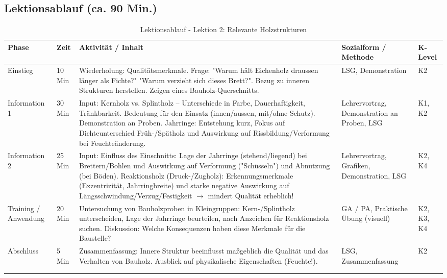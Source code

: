 \documentclass[12pt, a4paper]{article}
\begin{document}
\subsection{Lektionsablauf (ca. 90 Min.)}
\begin{longtable}{|p{}|p{}|>{\raggedright\arraybackslash}p{}|p{}|p{}|}
    \hline
    \textbf{Phase} & \textbf{Zeit} & \textbf{Aktivität / Inhalt} & \textbf{Sozialform / Methode} & \textbf{K-Level} \\
    \hline
    \endhead

    Einstieg & 10 Min & Wiederholung: Qualitätsmerkmale. Frage: "Warum hält Eichenholz draussen länger als Fichte?" "Warum verzieht sich dieses Brett?". Bezug zu inneren Strukturen herstellen. Zeigen eines Bauholz-Querschnitts. & LSG, Demonstration & K2 \\
    \hline
    Information 1 & 30 Min & Input: Kernholz vs. Splintholz – Unterschiede in Farbe, Dauerhaftigkeit, Tränkbarkeit. Bedeutung für den Einsatz (innen/aussen, mit/ohne Schutz). Demonstration an Proben. Jahrringe: Entstehung kurz, Fokus auf Dichteunterschied Früh-/Spätholz und Auswirkung auf Rissbildung/Verformung bei Feuchteänderung. & Lehrervortrag, Demonstration an Proben, LSG & K1, K2 \\
    \hline
    Information 2 & 25 Min & Input: Einfluss des Einschnitts: Lage der Jahrringe (stehend/liegend) bei Brettern/Bohlen und Auswirkung auf Verformung ("Schüsseln") und Abnutzung (bei Böden). Reaktionsholz (Druck-/Zugholz): Erkennungsmerkmale (Exzentrizität, Jahrringbreite) und starke negative Auswirkung auf Längsschwindung/Verzug/Festigkeit $\rightarrow$ mindert Qualität erheblich! & Lehrervortrag, Grafiken, Demonstration, LSG & K2, K4 \\
    \hline
    Training / Anwendung & 20 Min & Untersuchung von Bauholzproben in Kleingruppen: Kern-/Splintholz unterscheiden, Lage der Jahrringe beurteilen, nach Anzeichen für Reaktionsholz suchen. Diskussion: Welche Konsequenzen haben diese Merkmale für die Baustelle? & GA / PA, Praktische Übung (visuell) & K2, K3, K4 \\
    \hline
    Abschluss & 5 Min & Zusammenfassung: Innere Struktur beeinflusst maßgeblich die Qualität und das Verhalten von Bauholz. Ausblick auf physikalische Eigenschaften (Feuchte!). & LSG, Zusammenfassung & K2 \\
    \hline
    \caption{Lektionsablauf - Lektion 2: Relevante Holzstrukturen} \\
    \label{tab:lektion2-bf}
\end{longtable}
\end{document}
